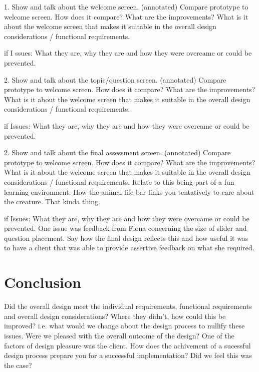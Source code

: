 \documentclass{l3proj}
\begin{document}
1. Show and talk about the welcome screen. (annotated)
Compare prototype to welcome screen. How does it compare? What are the improvements? What is it about the welcome screen that makes it suitable in the overall design considerations / functional requirements.

if I   ssues: What they are, why they are and how they were overcame or could be prevented.

2. Show and talk about the topic/question screen. (annotated)
Compare prototype to welcome screen. How does it compare? What are the improvements? What is it about the welcome screen that makes it suitable in the overall design considerations / functional requirements.

if Issues: What they are, why they are and how they were overcame or could be prevented.

2. Show and talk about the final assessment screen. (annotated)
Compare prototype to welcome screen. How does it compare? What are the improvements? What is it about the welcome screen that makes it suitable in the overall design considerations / functional requirements. Relate to this being part of a fun learning environment. How the animal life bar links you tentatively to care about the creature. That kinda thing.

if Issues: What they are, why they are and how they were overcame or could be prevented.
One issue was feedback from Fiona concerning the size of slider and question placement. Say how the final design reflects this and how useful it was to have a client that was able to provide assertive feedback on what she required. 

\section{Conclusion}

Did the overall design meet the individual requirements, functional requirements and overall design considerations?
Where they didn't, how could this be improved? i.e. what would we change about the design process to nullify these issues.
Were we pleased with the overall outcome of the design?
One of the factors of design pleasure was the client.
How does the achivement of a sucessful design process prepare you for a successful implementation?
Did we feel this was the case?
\end{document}
